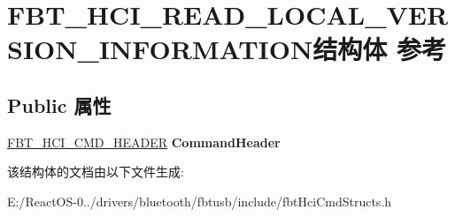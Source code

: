 \hypertarget{struct_f_b_t___h_c_i___r_e_a_d___l_o_c_a_l___v_e_r_s_i_o_n___i_n_f_o_r_m_a_t_i_o_n}{}\section{F\+B\+T\+\_\+\+H\+C\+I\+\_\+\+R\+E\+A\+D\+\_\+\+L\+O\+C\+A\+L\+\_\+\+V\+E\+R\+S\+I\+O\+N\+\_\+\+I\+N\+F\+O\+R\+M\+A\+T\+I\+O\+N结构体 参考}
\label{struct_f_b_t___h_c_i___r_e_a_d___l_o_c_a_l___v_e_r_s_i_o_n___i_n_f_o_r_m_a_t_i_o_n}
\subsection*{Public 属性}
\begin{DoxyCompactItemize}
\item 
\mbox{\label{struct_f_b_t___h_c_i___r_e_a_d___l_o_c_a_l___v_e_r_s_i_o_n___i_n_f_o_r_m_a_t_i_o_n_a4103cf966a8c57379af89680ae3e1512}} 
\hyperlink{struct_f_b_t___h_c_i___c_m_d___h_e_a_d_e_r}{F\+B\+T\+\_\+\+H\+C\+I\+\_\+\+C\+M\+D\+\_\+\+H\+E\+A\+D\+ER} {\bfseries Command\+Header}
\end{DoxyCompactItemize}


该结构体的文档由以下文件生成\+:\begin{DoxyCompactItemize}
\item 
E\+:/\+React\+O\+S-\/0../drivers/bluetooth/fbtusb/include/fbt\+Hci\+Cmd\+Structs.\+h\end{DoxyCompactItemize}
